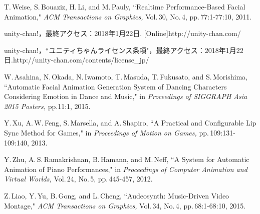 \begin{thebibliography}{55}
T.\,Weise, S.\,Bouaziz, H.\,Li, and M.\,Pauly,
 ``Realtime Performance-Based Facial Animation,"
 \textit{ACM Transactions on Graphics,} Vol.\,30, No.\,4, pp.\,77:1-77:10, 2011.

unity-chan!，最終アクセス：2018年1月22日.
[Online]http://unity-chan.com/

unity-chan!，``ユニティちゃんライセンス条項"，最終アクセス：2018年1月22日.\newline
[Online]http://unity-chan.com/contents/license\_jp/

W.\,Asahina, N.\,Okada, N.\,Iwamoto, T.\,Masuda, T.\,Fukusato, and S.\,Morishima,
 ``Automatic Facial Animation Generation System of Dancing Characters Considering Emotion in Dance and Music,"
 in \textit{Proceedings of SIGGRAPH Asia 2015 Posters,} pp.11:1, 2015.

Y.\,Xu, A.\,W.\,Feng, S.\,Marsella, and A.\,Shapiro,
 ``A Practical and Configurable Lip Sync Method for Games,"
 in \textit{Proceedings of Motion on Games,} pp.\,109:131-109:140, 2013.

Y.\,Zhu, A.\,S.\,Ramakrishnan, B.\,Hamann, and M.\,Neff,
 ``A System for Automatic Animation of Piano Performances,"
  in \textit{Proceedings of Computer Animation and Virtual Worlds,} Vol.\,24, No.\,5, pp.\,445-457, 2012.

Z.\,Liao, Y.\,Yu, B.\,Gong, and L.\,Cheng,
 ``Audeosynth: Music-Driven Video Montage,"
 \textit{ACM Transactions on Graphics,} Vol.\,34, No.\,4, pp.\,68:1-68:10, 2015.

\end{thebibliography}